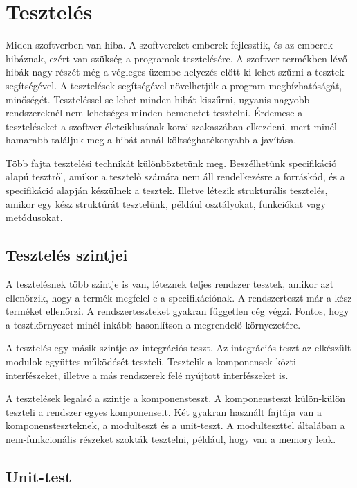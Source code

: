 \chapter{Tesztelés}

Miden szoftverben van hiba. A szoftvereket emberek fejlesztik, és az emberek hibáznak, ezért van szükség a programok tesztelésére. A szoftver termékben lévő hibák nagy részét még a végleges üzembe helyezés előtt ki lehet szűrni a tesztek segítségével. A tesztelések segítségével növelhetjük a program megbízhatóságát, minőségét. Teszteléssel se lehet minden hibát kiszűrni, ugyanis nagyobb rendszereknél nem lehetséges minden bemenetet tesztelni. Érdemese a teszteléseket a szoftver életciklusának korai szakaszában elkezdeni, mert minél hamarabb találjuk meg a hibát annál költséghatékonyabb a javítása.

Több fajta tesztelési technikát különböztetünk meg. Beszélhetünk specifikáció alapú tesztről, amikor a tesztelő számára nem áll rendelkezésre a forráskód, és a specifikáció alapján készülnek a tesztek. Illetve létezik strukturális tesztelés, amikor egy kész struktúrát tesztelünk, például osztályokat, funkciókat vagy metódusokat.

\section{Tesztelés szintjei}

A tesztelésnek több szintje is van, léteznek teljes rendszer tesztek,	 amikor azt ellenőrzik, hogy a termék megfelel e a specifikációnak. A rendszerteszt már a kész terméket ellenőrzi. A rendszerteszteket gyakran független cég végzi. Fontos, hogy a tesztkörnyezet minél inkább hasonlítson a megrendelő környezetére.

A tesztelés egy másik szintje az integrációs teszt. Az integrációs teszt az elkészült modulok együttes működését teszteli. Tesztelik a komponensek közti interfészeket, illetve a más rendszerek felé nyújtott interfészeket is.

A tesztelések legalsó a szintje a komponensteszt. A komponensteszt külön-külön teszteli a rendszer egyes komponenseit. Két gyakran használt fajtája van a komponensteszteknek, a modulteszt és a unit-teszt. A modulteszttel általában a nem-funkcionális részeket szokták tesztelni, például, hogy van a memory leak.

\section{Unit-test}

